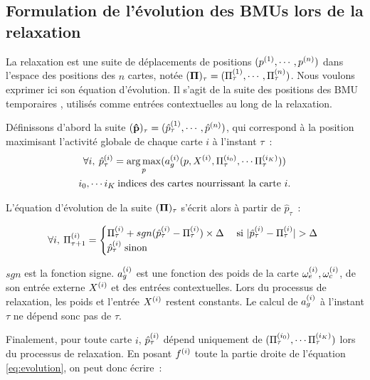 \documentclass[../main]{subfiles}
\begin{document}
\subsection{Formulation de l'évolution des BMUs lors de la relaxation}\label{sec:formulation_suite}

La relaxation est une suite de déplacements de positions $(p^{({1})},\cdots, p^{({n})})$ dans l'espace des positions des $n$ cartes, notée $(\mathbf{\Pi})_\tau = (\Pi^{({1})}_\tau,\cdots,\Pi^{({n})}_\tau)$. Nous voulons exprimer ici son équation d'évolution. Il s'agit de la suite des positions des \og BMU temporaires \fg{}, utilisés comme entrées contextuelles au long de la relaxation.

Définissons d'abord la suite $(\mathbf{\hat{p}})_\tau = (\hat{p}^{({1})}_\tau, \cdots, \hat{p}^{({n})})$, qui correspond à la position maximisant l'activité globale de chaque carte $i$ à l'instant $\tau$~:
\begin{equation}
\begin{gathered}
\forall i, \: \hat{p}^{({i})}_{\tau} = \operatorname*{arg\,max}\limits_p(a_g^{({i})}(p, X^{({i})}, \Pi^{({i_0})}_\tau, \cdots \Pi^{({i_K})}_\tau))\\
 i_0, \cdots i_K \: \text{indices des cartes nourrissant la carte $i$}.
\end{gathered}
\label{eq:pstar}
\end{equation}

L'équation d'évolution de la suite $(\mathbf{\Pi})_\tau$ s'écrit alors à partir de $\hat{p}_\tau$~:

\begin{equation}
\forall i, \: \Pi^{({i})}_{\tau+1} = 
\begin{cases}
\Pi^{({i})}_{\tau} + sgn(\hat{p}^{({i})}_{\tau} - \Pi^{({i})}_{\tau}) \times \Delta \; & \text{si $\lvert \hat{p}^{({i})}_{\tau} - \Pi^{({i})}_{\tau}\rvert > \Delta$ } \\
\hat{p}^{({i})}_{\tau} \; \text{sinon}	
\end{cases}
\label{eq:evolution}
\end{equation}

$sgn$ est la fonction signe.
$a_g^{({i})}$ est une fonction des poids de la carte $\omega_{e}^{({i})}, \omega_{c}^{({i})}$, de son entrée externe $X^{({i})}$ et des entrées contextuelles.
Lors du processus de relaxation, les poids et l'entrée $X^{({i})}$ restent constants. 
Le calcul de $a_g^{({i})}$ à l'instant $\tau$ ne dépend sonc pas de $\tau$.

Finalement, pour toute carte $i$, $\hat{p}^{({i})}_{\tau}$ dépend uniquement de $(\Pi^{({i_0})}_\tau, \cdots \Pi^{({i_K})}_\tau)$ lors du processus de relaxation.
En posant $f^{({i})}$ toute la partie droite de l'équation \ref{eq:evolution}, on peut donc écrire~:
\end{document}

